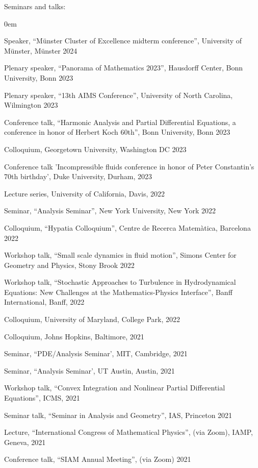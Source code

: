 \documentclass[10pt]{article}
\begin{document}
Seminars and talks:
\begin{list}{}{\leftmargin=1em}\small
\itemsep0em 
\item Speaker, ``M\"unster Cluster of Excellence midterm conference'', University of M\"unster, M\"unster 2024
\item Plenary speaker, ``Panorama of Mathematics 2023'', Hausdorff Center, Bonn University, Bonn 2023
\item Plenary speaker, ``13th AIMS Conference'', University of North Carolina, Wilmington 2023
\item Conference talk, ``Harmonic Analysis and Partial
Differential Equations, a conference in honor of Herbert Koch 60th'', Bonn University, Bonn 2023
\item Colloquium, Georgetown University, Washington DC 2023
\item Conference talk 'Incompressible fluids conference in honor of Peter Constantin's 70th birthday', Duke University, Durham, 2023
\item Lecture series, University of California, Davis, 2022
\item Seminar, ``Analysis Seminar'', New York University, New York 2022
\item Colloquium, ``Hypatia Colloquium'', Centre de Recerca Matem\`atica, Barcelona 2022
\item Workshop talk, ``Small scale dynamics in fluid motion'', Simons Center for Geometry and Physics, Stony Brook 2022
\item Workshop talk, ``Stochastic Approaches to Turbulence in Hydrodynamical Equations: New Challenges at the
Mathematics-Physics Interface'', Banff International, Banff, 2022
\item Colloquium, University of Maryland, College Park, 2022
\item Colloquium, Johns Hopkins, Baltimore, 2021
\item Seminar, ``PDE/Analysis Seminar', MIT, Cambridge, 2021
\item Seminar, ``Analysis Seminar', UT Austin, Austin, 2021
\item Workshop talk, ``Convex Integration and Nonlinear Partial Differential Equations'', ICMS, 2021
\item Seminar talk, ``Seminar in Analysis and Geometry'', IAS, Princeton 2021
\item Lecture, ``International Congress of Mathematical Physics'', (via Zoom), IAMP, Geneva, 2021
\item Conference talk, ``SIAM Annual Meeting'', (via Zoom) 2021

\end{list}
\end{document}
